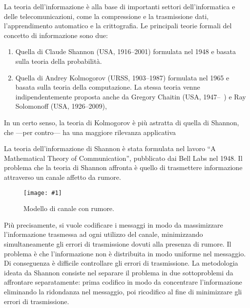 \documentclass[11pt]{article}
\newcommand{\figscale}[2]{\texttt{[image: \#1]}}
\begin{document}
\begin{center}
\end{center}

\bigskip

La teoria dell'informazione è alla base di importanti settori dell'informatica e delle telecomunicazioni, come la compressione e la trasmissione dati, l'apprendimento automatico e la crittografia. Le principali teorie formali del concetto di informazione sono due:
\begin{enumerate}
\item Quella di Claude Shannon (USA, 1916--2001) formulata nel 1948 e basata sulla teoria della probabilità.
\item Quella di Andrey Kolmogorov (URSS, 1903--1987) formulata nel 1965 e basata sulla teoria della computazione. La stessa teoria venne indipendentemente proposta anche da Gregory Chaitin (USA, 1947--\ ) e Ray Solomonoff (USA, 1926--2009), 
\end{enumerate}
In un certo senso, la teoria di Kolmogorov è più astratta di quella di Shannon, che ---per contro--- ha una maggiore rilevanza applicativa

La teoria dell'informazione di Shannon è stata formulata nel lavoro ``A Mathematical Theory of Communication'', pubblicato dai Bell Labs nel 1948. Il problema che la teoria di Shannon affronta è quello di trasmettere informazione attraverso un canale affetto da rumore.

\begin{figure}[h]
\begin{center}
\figscale{Images/canale}{0.5}
\end{center}
\caption{
\label{fig:canale}
Modello di canale con rumore.
}
\end{figure}

Più precisamente, si vuole codificare i messaggi in modo da massimizzare l'informazione trasmessa ad ogni utilizzo del canale, minimizzando simultaneamente gli errori di trasmissione dovuti alla presenza di rumore. Il problema è che l'informazione non è distribuita in modo uniforme nel messaggio. Di conseguenza è difficile controllare gli errori di trasmissione. La metodologia ideata da Shannon consiste nel separare il problema in due sottoproblemi da affrontare separatamente: prima codifico in modo da concentrare l'informazione eliminando la ridondanza nel messaggio, poi ricodifico al fine di minimizzare gli errori di trasmissione.
\end{document}
